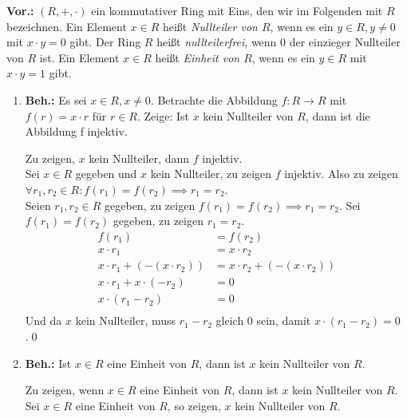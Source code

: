 \documentclass{gadsescript}
\begin{document}
\maketitle
\textbf{Vor.:} $ (R, +, \cdot ) $ ein kommutativer Ring mit Eins, den wir im Folgenden mit $ R $ bezeichnen. Ein Element $ x \in R $ heißt \textit{Nullteiler von $ R $}, wenn es ein $ y \in R, y \neq 0 $ mit $ x \cdot y = 0 $ gibt. Der Ring $ R $ heißt \textit{nullteilerfrei}, wenn 0 der einzieger Nullteiler von $ R $ ist. Ein Element $  x \in R $ heißt \textit{Einheit von $ R $}, wenn es ein $ y \in R $ mit $ x \cdot y = 1 $ gibt.
\begin{enumerate}[label=(\alph*)]
	\item \textbf{Beh.:} Es sei $ x \in R , x \neq 0 $. Betrachte die Abbildung $ f: R \to R $ mit $ f(r) = x \cdot r $ für $ r \in R $. Zeige: Ist $ x $ kein Nullteiler von $ R $, dann ist die Abbildung f injektiv.\\
		\begin{proof*}
			Zu zeigen, $ x $ kein Nullteiler, dann $ f $ injektiv.\\
			Sei $ x \in R $ gegeben und $ x $ kein Nullteiler, zu zeigen $ f $ injektiv. Also zu zeigen $ \forall r_1, r_2 \in R: f(r_1) = f(r_2) \implies r_1 = r_2 $.\\
			Seien $ r_1,r_2 \in R $ gegeben, zu zeigen $ f(r_1) = f(r_2) \implies r_1 = r_2 $. Sei $ f(r_1) = f(r_2) $ gegeben, zu zeigen $ r_1 = r_2 $.
			\begin{align*}
				f(r_1) &= f(r_2) \\
				x \cdot r_1 &= x \cdot r_2 \\
				x \cdot r_1 + (-(x \cdot r_2)) &= x \cdot r_2 + (-(x \cdot r_2)) \\
				x \cdot r_1 + x \cdot (-r_2) &= 0 \\
				x \cdot (r_1 - r_2) &= 0 \\
			\end{align*}
			Und da $ x $ kein Nullteiler, muss $ r_1 - r_2 $ gleich 0 sein, damit $ x \cdot (r_1 - r_2) = 0 $.\qed
		\end{proof*}
	\item \textbf{Beh.:} Ist $ x \in R $ eine Einheit von $ R $, dann ist $ x $ kein Nullteiler von $ R $.
		\begin{proof*}
			Zu zeigen, wenn $ x \in R $ eine Einheit von $ R $, dann ist $ x $ kein Nullteiler von $ R $.\\
			Sei $ x \in R $ eine Einheit von $ R $, so zeigen, $ x $ kein Nullteiler von $ R $.\\

\end{proof*}
\end{enumerate}
\end{document}
